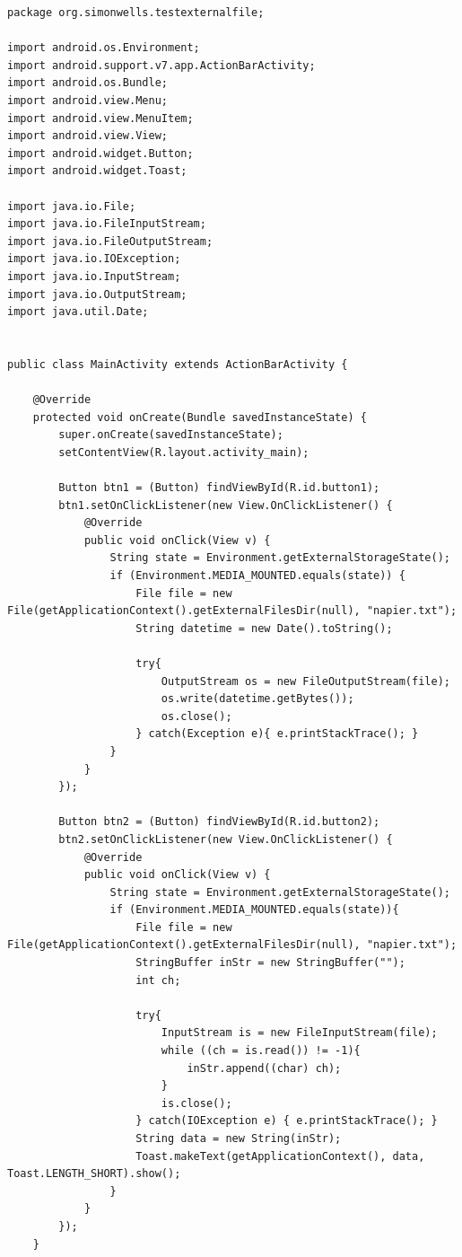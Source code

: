 \documentclass[12pt, a4paper, twoside]{book}
\begin{document}
\begin{lstlisting}
package org.simonwells.testexternalfile;

import android.os.Environment;
import android.support.v7.app.ActionBarActivity;
import android.os.Bundle;
import android.view.Menu;
import android.view.MenuItem;
import android.view.View;
import android.widget.Button;
import android.widget.Toast;

import java.io.File;
import java.io.FileInputStream;
import java.io.FileOutputStream;
import java.io.IOException;
import java.io.InputStream;
import java.io.OutputStream;
import java.util.Date;


public class MainActivity extends ActionBarActivity {

    @Override
    protected void onCreate(Bundle savedInstanceState) {
        super.onCreate(savedInstanceState);
        setContentView(R.layout.activity_main);

        Button btn1 = (Button) findViewById(R.id.button1);
        btn1.setOnClickListener(new View.OnClickListener() {
            @Override
            public void onClick(View v) {
                String state = Environment.getExternalStorageState();
                if (Environment.MEDIA_MOUNTED.equals(state)) {
                    File file = new File(getApplicationContext().getExternalFilesDir(null), "napier.txt");
                    String datetime = new Date().toString();

                    try{
                        OutputStream os = new FileOutputStream(file);
                        os.write(datetime.getBytes());
                        os.close();
                    } catch(Exception e){ e.printStackTrace(); }
                }
            }
        });

        Button btn2 = (Button) findViewById(R.id.button2);
        btn2.setOnClickListener(new View.OnClickListener() {
            @Override
            public void onClick(View v) {
                String state = Environment.getExternalStorageState();
                if (Environment.MEDIA_MOUNTED.equals(state)){
                    File file = new File(getApplicationContext().getExternalFilesDir(null), "napier.txt");
                    StringBuffer inStr = new StringBuffer("");
                    int ch;

                    try{
                        InputStream is = new FileInputStream(file);
                        while ((ch = is.read()) != -1){
                            inStr.append((char) ch);
                        }
                        is.close();
                    } catch(IOException e) { e.printStackTrace(); }
                    String data = new String(inStr);
                    Toast.makeText(getApplicationContext(), data, Toast.LENGTH_SHORT).show();
                }
            }
        });
    }



\end{lstlisting}
\end{document}
